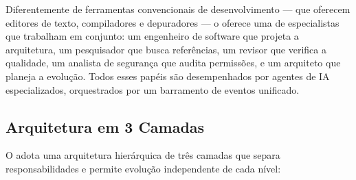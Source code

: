 Diferentemente de ferramentas convencionais de desenvolvimento --- que
oferecem editores de texto, compiladores e depuradores --- o
\opencodeeco{} oferece uma  de especialistas que
trabalham em conjunto: um engenheiro de software que projeta a arquitetura,
um pesquisador que busca referências, um revisor que verifica a qualidade,
um analista de segurança que audita permissões, e um arquiteto que planeja
a evolução. Todos esses papéis são desempenhados por agentes de IA
especializados, orquestrados por um barramento de eventos unificado.

\subsection{Arquitetura em 3 Camadas}

O \opencodeeco{} adota uma arquitetura hierárquica de três camadas que
separa responsabilidades e permite evolução independente de cada nível:

